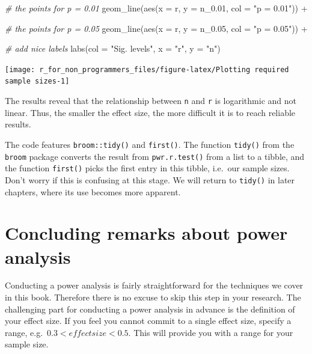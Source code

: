 \documentclass[
]{book}
\newenvironment{Shaded}{\begin{snugshade}}{\end{snugshade}}
\newcommand{\AttributeTok}[1]{\textcolor[rgb]{0.77,0.63,0.00}{#1}}
\newcommand{\CommentTok}[1]{\textcolor[rgb]{0.56,0.35,0.01}{\textit{#1}}}
\newcommand{\FloatTok}[1]{\textcolor[rgb]{0.00,0.00,0.81}{#1}}
\newcommand{\FunctionTok}[1]{\textcolor[rgb]{0.00,0.00,0.00}{#1}}
\newcommand{\NormalTok}[1]{#1}
\newcommand{\SpecialCharTok}[1]{\textcolor[rgb]{0.00,0.00,0.00}{#1}}
\newcommand{\StringTok}[1]{\textcolor[rgb]{0.31,0.60,0.02}{#1}}
\begin{document}
\begin{Shaded}
\begin{Highlighting}[]
  \CommentTok{\# the points for p = 0.01}
  \FunctionTok{geom\_line}\NormalTok{(}\FunctionTok{aes}\NormalTok{(}\AttributeTok{x =}\NormalTok{ r,}
                \AttributeTok{y =}\NormalTok{ n\_0}\FloatTok{.01}\NormalTok{,}
                \AttributeTok{col =} \StringTok{"p = 0.01"}\NormalTok{)) }\SpecialCharTok{+}

  \CommentTok{\# the points for p = 0.05}
  \FunctionTok{geom\_line}\NormalTok{(}\FunctionTok{aes}\NormalTok{(}\AttributeTok{x =}\NormalTok{ r,}
                \AttributeTok{y =}\NormalTok{ n\_0}\FloatTok{.05}\NormalTok{,}
                \AttributeTok{col =} \StringTok{"p = 0.05"}\NormalTok{)) }\SpecialCharTok{+}

  \CommentTok{\# add nice labels}
  \FunctionTok{labs}\NormalTok{(}\AttributeTok{col =} \StringTok{"Sig. levels"}\NormalTok{,}
       \AttributeTok{x =} \StringTok{"r"}\NormalTok{,}
       \AttributeTok{y =} \StringTok{"n"}\NormalTok{)}
\end{Highlighting}
\end{Shaded}

\begin{center}\texttt{[image: r\_for\_non\_programmers\_files/figure-latex/Plotting required sample sizes-1]} \end{center}

The results reveal that the relationship between \texttt{n} and \texttt{r} is logarithmic and not linear. Thus, the smaller the effect size, the more difficult it is to reach reliable results.

The code features \texttt{broom::tidy()} and \texttt{first()}. The function \texttt{tidy()} from the \texttt{broom} package converts the result from \texttt{pwr.r.test()} from a list to a tibble, and the function \texttt{first()} picks the first entry in this tibble, i.e.~our sample sizes. Don't worry if this is confusing at this stage. We will return to \texttt{tidy()} in later chapters, where its use becomes more apparent.

\hypertarget{concluding-remarks-about-power-analysis}{%
\section{Concluding remarks about power analysis}\label{concluding-remarks-about-power-analysis}}

Conducting a power analysis is fairly straightforward for the techniques we cover in this book. Therefore there is no excuse to skip this step in your research. The challenging part for conducting a power analysis in advance is the definition of your effect size. If you feel you cannot commit to a single effect size, specify a range, e.g.~\(0.3 < effect size < 0.5\). This will provide you with a range for your sample size.
\end{document}
